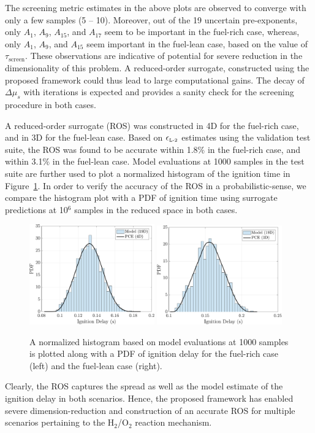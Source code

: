 %
The screening metric estimates in the above plots are observed to converge with
only a few samples (5 -- 10). Moreover, out of the 19 uncertain pre-exponents,
only $A_1$, $A_9$, $A_{15}$, and $A_{17}$ seem to be important in the fuel-rich
case, whereas, only $A_1$, $A_9$, and $A_{15}$ seem important in the fuel-lean
case, based on the value of $\tau_\text{screen}$. These observations are indicative
of potential for severe reduction in the dimensionality of this problem. A reduced-order
surrogate, constructed using the proposed framework could thus lead to large computational
gains. The decay of $\Delta\mu_s$ with iterations is expected and provides a sanity check
for the screening procedure in both cases.

A reduced-order surrogate (ROS) was constructed in 4D for the fuel-rich case, and in 3D for
the fuel-lean case. Based on $\epsilon_{\mbox{\tiny{L-2}}}$ estimates using the validation
test suite, the ROS was found to be accurate within 1.8$\%$ in the fuel-rich case, and
within 3.1$\%$ in the fuel-lean case. Model evaluations at 1000 samples in the test suite
are further used to plot a normalized histogram of the ignition time in 
Figure~\ref{fig:pdf_kinetics}. In order to verify the accuracy of the ROS in a 
probabilistic-sense, we compare the histogram plot with a PDF of ignition time
using surrogate predictions at 10$^{6}$ samples in the reduced space in both cases. 
%
\begin{figure}[htbp]
 \begin{center}
  \includegraphics[width=0.48\textwidth]{./Figures/pdf_comp_rich}
  \includegraphics[width=0.48\textwidth]{./Figures/pdf_comp_lean}
\caption{A normalized histogram based on model evaluations at 1000 samples is plotted
along with a PDF of ignition delay for the fuel-rich case (left) and the fuel-lean
case (right).}
\label{fig:pdf_kinetics}
\end{center}
\end{figure}
%
Clearly, the ROS captures the spread as well as the model estimate of
the ignition delay in both scenarios. Hence, the proposed framework 
has enabled severe dimension-reduction and construction of an accurate
ROS for multiple scenarios pertaining to the H$_2$/O$_2$ reaction
mechanism.    




